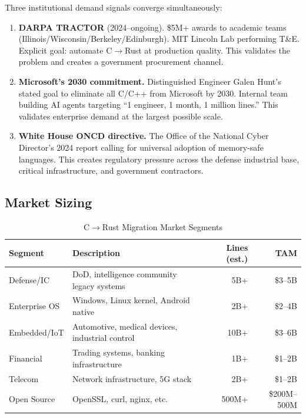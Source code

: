 \documentclass[11pt,a4paper]{article}
\theoremstyle{definition}
\theoremstyle{remark}
\begin{document}
Three institutional demand signals converge simultaneously:

\begin{enumerate}[leftmargin=2em]
\item \textbf{DARPA TRACTOR} (2024--ongoing). \$5M+ awards to academic teams (Illinois/Wisconsin/Berkeley/Edinburgh). MIT Lincoln Lab performing T\&E. Explicit goal: automate C$\to$Rust at production quality. This validates the problem and creates a government procurement channel.

\item \textbf{Microsoft's 2030 commitment.} Distinguished Engineer Galen Hunt's stated goal to eliminate all C/C++ from Microsoft by 2030. Internal team building AI agents targeting ``1 engineer, 1 month, 1 million lines.'' This validates enterprise demand at the largest possible scale.

\item \textbf{White House ONCD directive.} The Office of the National Cyber Director's 2024 report calling for universal adoption of memory-safe languages. This creates regulatory pressure across the defense industrial base, critical infrastructure, and government contractors.
\end{enumerate}

\subsection{Market Sizing}

\begin{table}[H]
\centering
\caption{C$\to$Rust Migration Market Segments}
\begin{tabularx}{\textwidth}{lXrr}
\toprule
\textbf{Segment} & \textbf{Description} & \textbf{Lines (est.)} & \textbf{TAM} \\
\midrule
Defense/IC & DoD, intelligence community legacy systems & 5B+ & \$3--5B \\
Enterprise OS & Windows, Linux kernel, Android native & 2B+ & \$2--4B \\
Embedded/IoT & Automotive, medical devices, industrial control & 10B+ & \$3--6B \\
Financial & Trading systems, banking infrastructure & 1B+ & \$1--2B \\
Telecom & Network infrastructure, 5G stack & 2B+ & \$1--2B \\
Open Source & OpenSSL, curl, nginx, etc. & 500M+ & \$200M--500M \\
\bottomrule
\end{tabularx}
\end{table}
\end{document}
